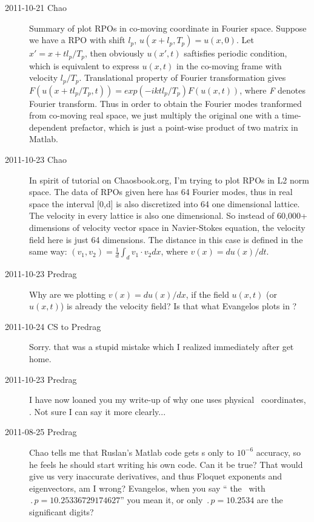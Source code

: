 \begin{description}
\item[2011-10-21 Chao] Summary of plot RPOs in co-moving coordinate in Fourier space.
Suppose we have a RPO with shift $\textit{$l_p$}$, $u(x+\textit{$l_p$},\textit{$T_p$})=u(x,0)$. Let $x'=x+t\textit{$l_p$}/\textit{$T_p$}$, then obviously $u(x',t)$ saftisfies periodic condition, which is equivalent to express $u(x,t)$ in the co-moving frame with velocity $\textit{$l_p$}/\textit{$T_p$}$.  Translational property of Fourier transformation gives $\textit{F}(u(x+t\textit{$l_p$}/\textit{$T_p$},\textit{t})) = exp(-ikt\textit{$l_p$}/\textit{$T_p$})\textit{F}(u(x,t))$, where \textit{F} denotes Fourier transform. Thus in order to obtain the Fourier modes tranformed from co-moving real space, we just multiply the original one with a time-dependent prefactor, which is just a point-wise product of two matrix in Matlab.

\item[2011-10-23 Chao] In spirit of tutorial on Chaosbook.org, I'm trying
to plot RPOs in L2 norm space. The data of RPOs given here has 64 Fourier
modes, thus in real space the interval [0,d] is also discretized into 64
one dimensional lattice. The velocity in every lattice is also one
dimensional. So instead of 60,000+ dimensions of velocity vector space in
Navier-Stokes equation, the velocity field here is just 64 dimensions.
The distance in this case is defined in the same way: $(v_1,v_2) =
\frac{1}{d}\int_d{v_1}\cdot{v_2}dx$, where $v(x)=du(x)/dt$.

\item[2011-10-23 Predrag]
Why are we plotting $v(x)=du(x)/dx$,
if the field $u(x,t)$ (or $u(x,t)$) is already the velocity field?
Is that what Evangelos plots in ?



\item[2011-10-24 CS to Predrag]
Sorry. that was a stupid mistake which I realized immediately after get home.

\item[2011-10-23 Predrag]
I have now loaned you my write-up of why one uses physical \statesp\
coordinates, . Not sure I can say it more
clearly...

\item[2011-08-25 Predrag] Chao tells me that Ruslan's Matlab code gets
\rpo s only to $10^{-6}$ accuracy, so he feels he should start writing
his own code. Can it be true? That would give us very inaccurate
derivatives, and thus Floquet exponents and eigenvectors, am I wrong?
Evangelos, when you say ``\PO{10.25} the \po\ with
$\period{p}=10.25336729174627$'' you mean it, or only
$\period{p}=10.2534$ are the significant digits?


\end{description}
